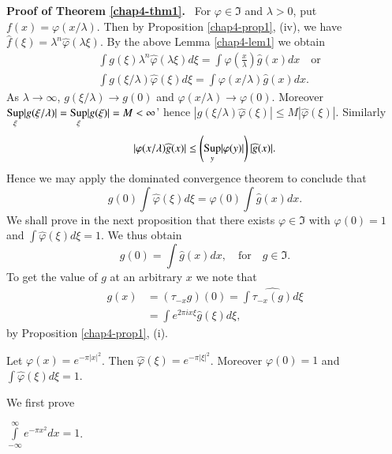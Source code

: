 \noindent
{\bf Proof of Theorem \ref{chap4-thm1}.}~
For $\varphi\in \mathfrak{I}$ and $\lambda >0$, put
$f(x)=\varphi(x/\lambda)$. Then by Proposition \ref{chap4-prop1},
(iv), we have $\widehat{f}(\xi)=\lambda^{n}\widehat{\varphi}(\lambda
\xi)$. By the above Lemma \ref{chap4-lem1} we obtain
\begin{align*}
& \int g(\xi)\lambda^{n}\widehat{\varphi}(\lambda \xi)d\xi=\int
  \varphi\left(\frac{x}{\lambda}\right)\widehat{g}(x)dx\quad\text{or}\\[3pt]
& \int g(\xi/\lambda)\widehat{\varphi}(\xi)d\xi=\int \varphi (x/\lambda)\widehat{g}(x)dx.
\end{align*}
As $\lambda\to \infty$, $g(\xi/\lambda)\to g(0)$ and
$\varphi(x/\lambda)\to \varphi(0)$. Moreover
$\displaystyle{\mathop{\operatorname{Sup}}_{\xi}}|g(\xi/\lambda)|=\displaystyle{\mathop{\operatorname{Sup}}_{\xi}}|g(\xi)|=M<\infty$'
hence $|g(\xi/\lambda)\widehat{\varphi}(\xi)|\leq
M|\widehat{\varphi}(\xi)|$. Similarly
$$
|\varphi (x/\lambda)\widehat{g}(x)|\leq
\left(\displaystyle{\mathop{\operatorname{Sup}}_{y}}|\varphi (y)|\right)|\widehat{g}(x)|.
$$
Hence we may apply the dominated convergence theorem to conclude that
$$
g(0)\int \widehat{\varphi}(\xi)d\xi=\varphi(0)\int \widehat{g}(x)dx.
$$
We shall prove in the next proposition that there exists $\varphi\in
\mathfrak{I}$ with $\varphi(0)=1$ and $\int
\widehat{\varphi}(\xi)d\xi=1$. We thus obtain
$$
g(0)=\int \widehat{g}(x) dx,\quad\text{for}\quad g\in \mathfrak{I}.
$$
To get the value of $g$ at an arbitrary $x$ we note that
\begin{align*}
g(x) &= (\tau_{-x}g)(0)=\int \widehat{\tau_{-x}(g)}d\xi\\[3pt]
&= \int e^{2\pi ix\xi}\widehat{g}(\xi)d\xi,
\end{align*}
by Proposition \ref{chap4-prop1}, (i).

\begin{proposition}\label{chap4-prop6}
Let $\varphi(x)=e^{-\pi |x|^{2}}$. Then
$\widehat{\varphi}(\xi)=e^{-\pi|\xi|^{2}}$. Moreover\pageoriginale
$\varphi(0)=1$ and $\int \widehat{\varphi}(\xi)d\xi=1$.
\end{proposition}

We first prove

\begin{lemma}\label{chap4-lem2}
$\int\limits^{\infty}_{-\infty}e^{-\pi x^{2}}dx=1$.
\end{lemma}

